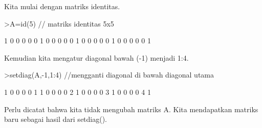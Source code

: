\documentclass{article}
\newenvironment{eulernotebook}{\par}{\par}
\newenvironment{eulercomment}{\par\medskip}{\par\medskip}
\begin{document}
\begin{eulernotebook}
\begin{eulercomment}
\begin{eulercomment}
\begin{eulercomment}
\begin{eulercomment}
\begin{eulercomment}
\begin{eulercomment}
\begin{eulercomment}
Kita mulai dengan matriks identitas.
\end{eulercomment}
\begin{eulerprompt}
>A=id(5) // matriks identitas 5x5
\end{eulerprompt}
\begin{euleroutput}
              1             0             0             0             0 
              0             1             0             0             0 
              0             0             1             0             0 
              0             0             0             1             0 
              0             0             0             0             1 
\end{euleroutput}
\begin{eulercomment}
Kemudian kita mengatur diagonal bawah (-1) menjadi 1:4.
\end{eulercomment}
\begin{eulerprompt}
>setdiag(A,-1,1:4) //mengganti diagonal di bawah diagonal utama
\end{eulerprompt}
\begin{euleroutput}
              1             0             0             0             0 
              1             1             0             0             0 
              0             2             1             0             0 
              0             0             3             1             0 
              0             0             0             4             1 
\end{euleroutput}
\begin{eulercomment}
Perlu dicatat bahwa kita tidak mengubah matriks A. Kita mendapatkan
matriks baru sebagai hasil dari setdiag().


\end{eulercomment}
\end{eulercomment}
\end{eulercomment}
\end{eulercomment}
\end{eulercomment}
\end{eulercomment}
\end{eulercomment}
\end{eulernotebook}
\end{document}
